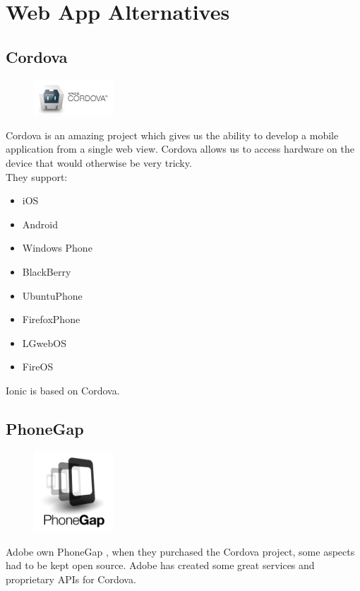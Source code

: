 \section{Web App Alternatives}
\subsection{Cordova}
\begin{figure}
\includegraphics[width=3cm]{img/mobile-app/logos/cordova.jpg}
\end{figure} 
Cordova \cite{cordova} is an amazing project which gives us the ability to develop a mobile application from a single web view.
Cordova allows us to access hardware on the device that would otherwise be very tricky.
\\

They support:
\begin{itemize}
\item iOS
\item Android
\item Windows Phone
\item BlackBerry
\item UbuntuPhone
\item FirefoxPhone
\item LGwebOS
\item FireOS
\end{itemize}

Ionic is based on Cordova.

\subsection{PhoneGap}
\begin{figure}
\includegraphics[width=3cm]{img/mobile-app/logos/PhoneGap.png}
\end{figure} 
Adobe own PhoneGap \cite{phonegap}, when they purchased the Cordova project, some aspects had to be kept open source.
Adobe has created some great services and proprietary APIs for Cordova.

